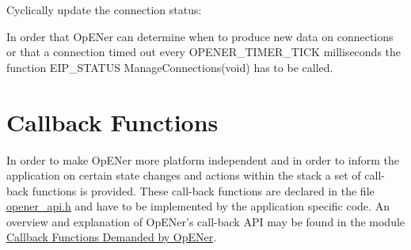 \begin{DoxyItemize}
\begin{DoxyEnumerate}
\end{DoxyEnumerate}
\item \-Cyclically update the connection status\-:\par
 \-In order that \-Op\-E\-Ner can determine when to produce new data on connections or that a connection timed out every \-O\-P\-E\-N\-E\-R\-\_\-\-T\-I\-M\-E\-R\-\_\-\-T\-I\-C\-K milliseconds the function \-E\-I\-P\-\_\-\-S\-T\-A\-T\-U\-S \-Manage\-Connections(void) has to be called.
\end{DoxyItemize}\hypertarget{dc/dcb/porting_callback_funcs_sec}{}\section{\-Callback Functions}\label{dc/dcb/porting_callback_funcs_sec}
\-In order to make \-Op\-E\-Ner more platform independent and in order to inform the application on certain state changes and actions within the stack a set of call-\/back functions is provided. \-These call-\/back functions are declared in the file \hyperlink{opener__api_8h}{opener\-\_\-api.\-h} and have to be implemented by the application specific code. \-An overview and explanation of \-Op\-E\-Ner's call-\/back \-A\-P\-I may be found in the module \hyperlink{group__CIP__CALLBACK__API}{\-Callback \-Functions \-Demanded by \-Op\-E\-Ner}. 
